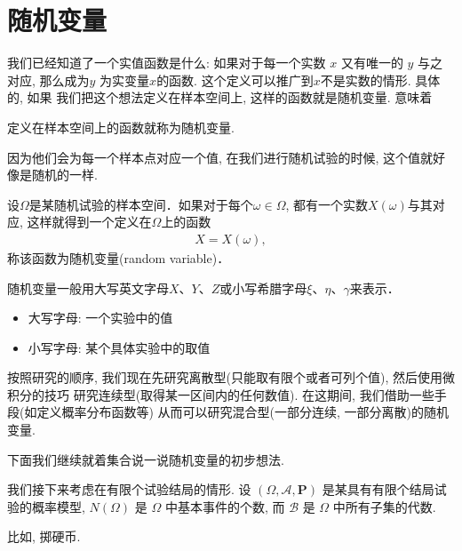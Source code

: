 \section{随机变量}

我们已经知道了一个实值函数是什么: 如果对于每一个实数 $x$ 又有唯一的 $y$ 与之对应,
那么成为$y$ 为实变量$x$的函数. 这个定义可以推广到$x$不是实数的情形. 具体的, 如果
我们把这个想法定义在样本空间上, 这样的函数就是随机变量. 意味着

\begin{definition*}
    定义在样本空间上的函数就称为随机变量.
\end{definition*}

因为他们会为每一个样本点对应一个值, 在我们进行随机试验的时候, 这个值就好像是随机的一样.

\begin{definition}[随机变量]
    设$\Omega$是某随机试验的样本空间．如果对于每个$\omega\in\Omega$, 都有一个实数$X(\omega)$与其对应, 这样就得到一个定义在$\Omega$上的函数
    \begin{align*}
        X=X(\omega),
    \end{align*}
    称该函数为随机变量(random variable)．
\end{definition}

随机变量一般用大写英文字母$X$、$Y$、$Z$或小写希腊字母$\xi$、$\eta$、$\gamma$来表示．
\begin{itemize}
    \item 大写字母: 一个实验中的值
    \item 小写字母: 某个具体实验中的取值
\end{itemize}

按照研究的顺序, 我们现在先研究离散型(只能取有限个或者可列个值), 然后使用微积分的技巧
研究连续型(取得某一区间内的任何数值). 在这期间, 我们借助一些手段(如定义概率分布函数等)
从而可以研究混合型(一部分连续, 一部分离散)的随机变量.

下面我们继续就着集合说一说随机变量的初步想法. 

我们接下来考虑在有限个试验结局的情形. 设 $(\Omega, \mathscr{A}, \mathbf{P})$ 是某具有有限个结局试验的概率模型, $N(\Omega)$ 是 $\Omega$ 中基本事件的个数, 而 $\mathscr{B}$ 是 $\Omega$ 中所有子集的代数. 

比如, 掷硬币. 

